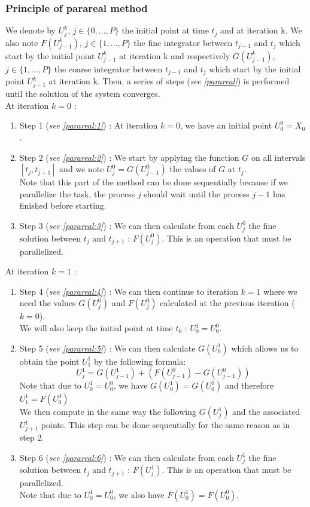 \subsubsection{Principle of parareal method}
\label{section parareal method}

\noindent We denote by $U_j^k$, $j\in\{0,\dots,P\}$ the initial point at time $t_j$ and at iteration k. We also note $F(U_{j-1}^k)$, $j\in\{1,\dots,P\}$ the fine integrator between $t_{j-1}$ and $t_j$ which start by the initial point $U_{j-1}^k$ at iteration k and respectively $G(U_{j-1}^k)$, $j\in\{1,\dots,P\}$ the coarse integrator between $t_{j-1}$ and $t_j$ which start by the initial point $U_{j-1}^k$ at iteration k. Then, a series of steps (\textit{see \ref{parareal}}) is performed until the solution of the system converges. \\

\noindent At iteration $k=0$ :
\begin{enumerate}[label=\textbullet]	
	\item Step 1 (\textit{see \ref{parareal:1}}) : At iteration $k=0$, we have an initial point $U_0^0=X_0$.
	\item Step 2 (\textit{see \ref{parareal:2}}) : We start by applying the function $G$ on all intervals $[t_j,t_{j+1}]$ and we note $U_j^0=G(U_{j-1}^0)$ the values of $G$ at $t_j$. \\
	Note that this part of the method can be done sequentially because if we parallelize the task, the process $j$ should wait until the process $j-1$ has finished before starting.
	\item Step 3 (\textit{see \ref{parareal:3}}) : We can then calculate from each $U_j^0$ the fine solution between $t_j$ and $t_{j+1}$ : $F(U_j^0)$. This is an operation that must be parallelized.
\end{enumerate}

\noindent At iteration $k=1$ :
\begin{enumerate}[label=\textbullet]	
	\item Step 4 (\textit{see \ref{parareal:4}}) : We can then continue to iteration $k=1$ where we need the values $G(U_j^0)$ and $F(U_j^0)$ calculated at the previous iteration ($k=0$). \\
	We will also keep the initial point at time $t_0$ : $U_0^1=U_0^0$.
	\item Step 5 (\textit{see \ref{parareal:5}}) : We can then calculate $G(U_0^1)$ which allows us to obtain the point $U_1^1$ by the following formula:
	$$U_j^1=G(U_{j-1}^1)+(F(U_{j-1}^0)-G(U_{j-1}^0))$$
	Note that due to $U_0^1=U_0^0$, we have $G(U_0^1)=G(U_0^0)$ and therefore $U_1^1=F(U_0^0)$ \\
	We then compute in the same way the following $G(U_j^1)$ and the associated $U_{j+1}^1$ points. This step can be done sequentially for the same reason as in step 2.
	\item Step 6 (\textit{see \ref{parareal:6}}) : We can then calculate from each $U_j^1$ the fine solution between $t_j$ and $t_{j+1}$ : $F(U_j^1)$. This is an operation that must be parallelized. \\
	Note that due to $U_0^1=U_0^0$, we also have $F(U_0^1)=F(U_0^0)$.
\end{enumerate}

